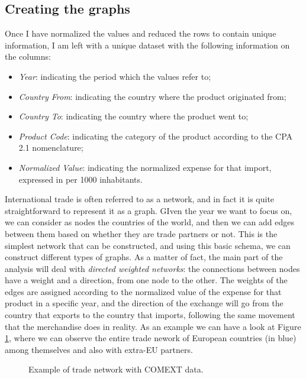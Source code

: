 \subsection{Creating the graphs}
Once I have normalized the values and reduced the rows to contain unique information, I am left with a unique dataset with the following information on the columns:
\begin{itemize}
    \item \textit{Year}: indicating the period which the values refer to;
    \item \textit{Country From}: indicating the country where the product originated from;
    \item \textit{Country To}: indicating the country where the product went to;
    \item \textit{Product Code}: indicating the category of the product according to the CPA 2.1 nomenclature;
    \item \textit{Normalized Value}: indicating the normalized expense for that import, expressed in \texteuro per 1000 inhabitants.
\end{itemize}
International trade is often referred to as a network, and in fact it is quite straightforward to represent it as a graph. GIven the year we want to focus on, we can consider as nodes the countries of the world, and then we can add edges between them based on whether they are trade partners or not. This is the simplest network that can be constructed, and using this basic schema, we can construct different types of graphs. As a matter of fact, the main part of the analysis will deal with \textit{directed weighted networks}: the connections between nodes have a weight and a direction, from one node to the other. The weights of the edges are assigned according to the normalized value of the expense for that product in a specific year, and the direction of the exchange will go from the country that exports to the country that imports, following the same movement that the merchandise does in reality.
As an example we can have a look at Figure \ref{fig:gcomext}, where we can observe the entire trade nework of European countries (in blue) among themselves and also with extra-EU partners.

\begin{figure}
    \caption{Example of trade network with COMEXT data.}
    \label{fig:gcomext}
\end{figure}

